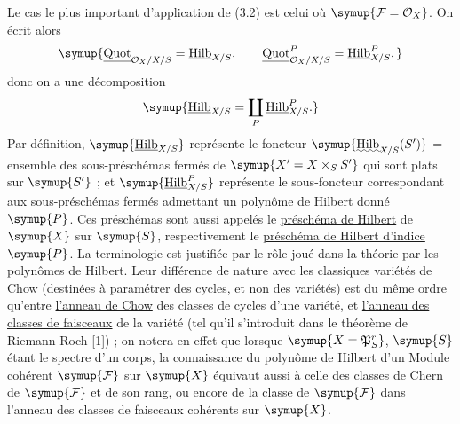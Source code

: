 Le cas le plus important d'application de (3.2) est celui où
$\symup{\mathcal F=\mathcal O_X}$. On écrit alors
\[
\symup{\underline{\operatorname{Quot}}_{\mathcal O_X/X/S}=\underline{\operatorname{Hilb}}_{X/S},
\qquad
\underline{\operatorname{Quot}}^P_{\mathcal O_X/X/S}=\underline{\operatorname{Hilb}}^P_{X/S},}
\]
donc on a une décomposition
\[
\symup{\underline{\operatorname{Hilb}}_{X/S}=\coprod_P\underline{\operatorname{Hilb}}^P_{X/S}.}
\]
Par définition, $\symup{\underline{\operatorname{Hilb}}_{X/S}}$ représente le foncteur
$\symup{\mathop{\text{\uwave{Hilb}}}\nolimits_{X/S}(S')}$ = ensemble des sous-préschémas
fermés de $\symup{X'=X\times_SS'}$ qui sont plats sur $\symup{S'}$ ; et
$\symup{\underline{\operatorname{Hilb}}^P_{X/S}}$ représente le sous-foncteur correspondant aux
sous-préschémas fermés admettant un polynôme de Hilbert donné $\symup{P}$. Ces
préschémas sont aussi appelés le \uline{préschéma de Hilbert} de $\symup{X}$ sur $\symup{S}$,
respectivement le \uline{préschéma de Hilbert d'indice} $\symup{P}$. La terminologie est
justifiée par le rôle joué dans la théorie par les polynômes de Hilbert. Leur
différence de nature avec les classiques variétés de Chow (destinées à
paramétrer des cycles, et non des variétés) est du même ordre qu'entre
\uline{l'anneau de Chow} des classes de cycles d'une variété, et \uline{l'anneau des classes de faisceaux} de la variété (tel qu'il s'introduit dans le théorème de
Riemann-Roch [1]) ; on notera en effet que lorsque $\symup{X=\mathfrak P^r_S}$, $\symup{S}$
étant le spectre d'un corps, la connaissance du polynôme de Hilbert d'un Module
cohérent $\symup{\mathcal F}$ sur $\symup{X}$ équivaut aussi à celle des classes de Chern de
$\symup{\mathcal F}$ et de son rang, ou encore de la classe de $\symup{\mathcal F}$ dans l'anneau des classes
de faisceaux cohérents sur $\symup{X}$.

